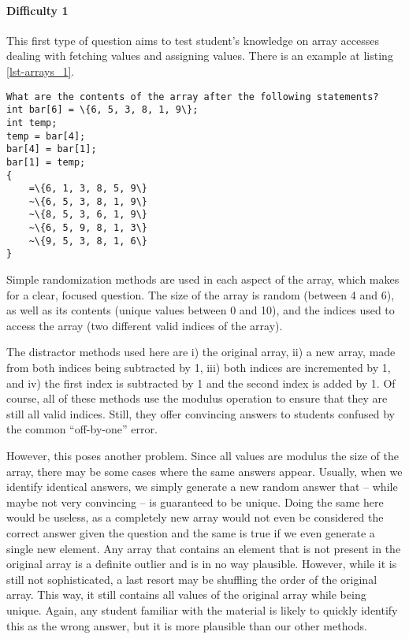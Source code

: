 \documentclass{article}
\begin{document}
\paragraph{Difficulty 1} \hfill \par

This first type of question aims to test student's knowledge on array accesses dealing with fetching values and assigning values. There is an example at listing \ref{lst-arrays_1}.

\begin{lstlisting}[caption={\textbf{Arrays} Difficulty 1 GIFT Example}, label=lst-arrays_1]
What are the contents of the array after the following statements? 
int bar[6] = \{6, 5, 3, 8, 1, 9\}; 
int temp; 
temp = bar[4]; 
bar[4] = bar[1]; 
bar[1] = temp;
{
	=\{6, 1, 3, 8, 5, 9\}
	~\{6, 5, 3, 8, 1, 9\}
	~\{8, 5, 3, 6, 1, 9\}
	~\{6, 5, 9, 8, 1, 3\}
	~\{9, 5, 3, 8, 1, 6\}
} 
\end{lstlisting}


Simple randomization methods are used in each aspect of the array, which makes for a clear, focused question. The size of the array is random (between 4 and 6), as well as its contents
(unique values between 0 and 10), and the indices used to access the array (two different valid indices of the array). 

The distractor methods used here are i) the original array, ii) a new array, made from both indices being subtracted by 1, iii) both indices are incremented by 1, and iv) the first index is
subtracted by 1 and the second index is added by 1. Of course, all of these methods use the modulus operation to ensure that they are still all valid indices. Still, they offer convincing 
answers to students confused by the common ``off-by-one'' error. 

However, this poses another problem. Since all values are modulus the size of the array, there may be some cases where the same answers appear. Usually, when we identify identical answers,
we simply generate a new random answer that -- while maybe not very convincing -- is guaranteed to be unique. Doing the same here would be useless, as a completely new array would not
even be considered the correct answer given the question and the same is true if we even generate a single new element. Any array that contains an element that is not present in the 
original array is a definite outlier and is in no way plausible. However, while it is still not sophisticated, a last resort may be shuffling the order of the original array. This way, it still contains all
values of the original array while being unique. Again, any student familiar with the material is likely to quickly identify this as the wrong answer, but it is more plausible than our other methods.
\end{document}
